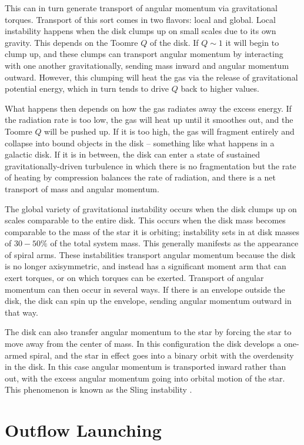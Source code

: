 This can in turn generate transport of angular momentum via gravitational torques. Transport of this sort comes in two flavors: local and global. Local instability happens when the disk clumps up on small scales due to its own gravity. This depends on the Toomre $Q$ of the disk. If $Q\sim 1$ it will begin to clump up, and these clumps can transport angular momentum by interacting with one another gravitationally, sending mass inward and angular momentum outward. However, this clumping will heat the gas via the release of gravitational potential energy, which in turn tends to drive $Q$ back to higher values.

What happens then depends on how the gas radiates away the excess energy. If the radiation rate is too low, the gas will heat up until it smoothes out, and the Toomre $Q$ will be pushed up. If it is too high, the gas will fragment entirely and collapse into bound objects in the disk -- something like what happens in a galactic disk. If it is in between, the disk can enter a state of sustained gravitationally-driven turbulence in which there is no fragmentation but the rate of heating by compression balances the rate of radiation, and there is a net transport of mass and angular momentum.

The global variety of gravitational instability occurs when the disk clumps up on scales comparable to the entire disk. This occurs when the disk mass becomes comparable to the mass of the star it is orbiting; instability sets in at disk masses of $30-50\%$ of the total system mass. This generally manifests as the appearance of spiral arms. These instabilities transport angular momentum because the disk is no longer axisymmetric, and instead has a significant moment arm that can exert torques, or on which torques can be exerted. Transport of angular momentum can then occur in several ways. If there is an envelope outside the disk, the disk can spin up the envelope, sending angular momentum outward in that way.

The disk can also transfer angular momentum to the star by forcing the star to move away from the center of mass. In this configuration the disk develops a one-armed spiral, and the star in effect goes into a binary orbit with the overdensity in the disk. In this case angular momentum is transported inward rather than out, with the excess angular momentum going into orbital motion of the star. This phenomenon is known as the Sling instability \citep{shu90a}.

\section{Outflow Launching}

